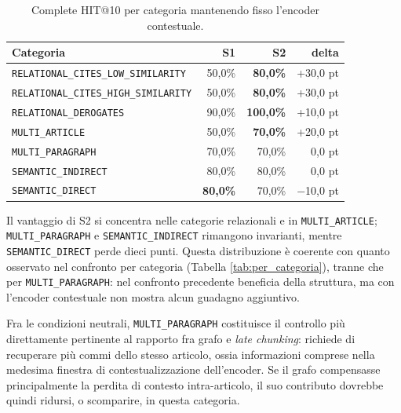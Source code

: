 \begin{table}[H]
    \centering
    \renewcommand{\arraystretch}{1.2}
    \begin{tabular}{|l|r|r|r|}
        \hline
        \textbf{Categoria} & \textbf{S1} & \textbf{S2} & \textbf{delta} \\
        \hline
        \texttt{RELATIONAL\_CITES\_LOW\_SIMILARITY} & 50,0\% & \textbf{80,0\%} & +30,0 pt \\
        \texttt{RELATIONAL\_CITES\_HIGH\_SIMILARITY} & 50,0\% & \textbf{80,0\%} & +30,0 pt \\
        \texttt{RELATIONAL\_DEROGATES} & 90,0\% & \textbf{100,0\%} & +10,0 pt \\
        \texttt{MULTI\_ARTICLE} & 50,0\% & \textbf{70,0\%} & +20,0 pt \\
        \rowcolor{orange!25}
        \texttt{MULTI\_PARAGRAPH} & 70,0\% & 70,0\% & 0,0 pt \\
        \texttt{SEMANTIC\_INDIRECT} & 80,0\% & 80,0\% & 0,0 pt \\
        \texttt{SEMANTIC\_DIRECT} & \textbf{80,0\%} & 70,0\% & $-$10,0 pt \\
        \hline
    \end{tabular}
    \caption{Complete HIT@10 per categoria mantenendo fisso l'encoder contestuale.}
    \label{tab:antitesi_per_categoria}
\end{table}

Il vantaggio di S2 si concentra nelle categorie relazionali e in \texttt{MULTI\_ARTICLE}; \texttt{MULTI\_PARAGRAPH} e \texttt{SEMANTIC\_INDIRECT} rimangono invarianti, mentre \texttt{SEMANTIC\_DIRECT} perde dieci punti. Questa distribuzione è coerente con quanto osservato nel confronto per categoria (Tabella \ref{tab:per_categoria}), tranne che per \texttt{MULTI\_PARAGRAPH}: nel confronto precedente beneficia della struttura, ma con l'encoder contestuale non mostra alcun guadagno aggiuntivo.

Fra le condizioni neutrali, \texttt{MULTI\_PARAGRAPH} costituisce il controllo più direttamente pertinente al rapporto fra grafo e \textit{late chunking}: richiede di recuperare più commi dello stesso articolo, ossia informazioni comprese nella medesima finestra di contestualizzazione dell'encoder. Se il grafo compensasse principalmente la perdita di contesto intra-articolo, il suo contributo dovrebbe quindi ridursi, o scomparire, in questa categoria.

